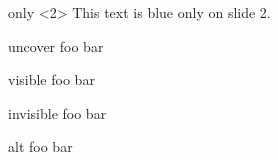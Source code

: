 \documentclass{beamer}
\begin{document}

\newcommand{\myblue}{\only{\color{blue}}}
\begin{frame}{only}
\myblue<2> This text is blue only on slide 2.
\end{frame}

%

\begin{frame}{uncover}
foo
bar
\end{frame}

%

\begin{frame}{visible}
foo
bar
\end{frame}

%

\begin{frame}{invisible}
foo
bar
\end{frame}

%

\begin{frame}{alt}
foo
bar
\end{frame}

%
\end{document}
